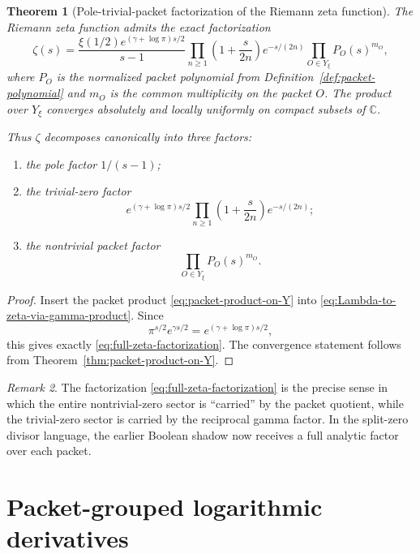 \documentclass[11pt,a4paper]{article}
\newtheorem{theorem}{Theorem}[section]
\theoremstyle{definition}
\theoremstyle{remark}
\newtheorem{remark}[theorem]{Remark}
\newcommand{\CC}{\mathbb C}
\begin{document}
\begin{theorem}[Pole-trivial-packet factorization of the Riemann zeta function]\label{thm:full-zeta-factorization}
The Riemann zeta function admits the exact factorization
\begin{equation}\label{eq:full-zeta-factorization}
\zeta(s)
=
\frac{\xi(1/2)e^{(\gamma+\log\pi)s/2}}{s-1}
\prod_{n\ge 1}\left(1+\frac{s}{2n}\right)e^{-s/(2n)}
\prod_{O\in Y_\xi} P_O(s)^{m_O},
\end{equation}
where $P_O$ is the normalized packet polynomial from Definition~\ref{def:packet-polynomial} and $m_O$ is the common multiplicity on the packet $O$.  The product over $Y_\xi$ converges absolutely and locally uniformly on compact subsets of $\CC$.

Thus $\zeta$ decomposes canonically into three factors:
\begin{enumerate}[label=(\roman*)]
\item the pole factor $1/(s-1)$;
\item the trivial-zero factor
\[
e^{(\gamma+\log\pi)s/2}\prod_{n\ge 1}\left(1+\frac{s}{2n}\right)e^{-s/(2n)};
\]
\item the nontrivial packet factor
\[
\prod_{O\in Y_\xi} P_O(s)^{m_O}.
\]
\end{enumerate}
\end{theorem}

\begin{proof}
Insert the packet product \eqref{eq:packet-product-on-Y} into \eqref{eq:Lambda-to-zeta-via-gamma-product}.  Since
\[
\pi^{s/2}e^{\gamma s/2}=e^{(\gamma+\log\pi)s/2},
\]
this gives exactly \eqref{eq:full-zeta-factorization}.  The convergence statement follows from Theorem~\ref{thm:packet-product-on-Y}.
\end{proof}

\begin{remark}
The factorization \eqref{eq:full-zeta-factorization} is the precise sense in which the entire nontrivial-zero sector is ``carried'' by the packet quotient, while the trivial-zero sector is carried by the reciprocal gamma factor.  In the split-zero divisor language, the earlier Boolean shadow now receives a full analytic factor over each packet.
\end{remark}

\section{Packet-grouped logarithmic derivatives}
\end{document}
